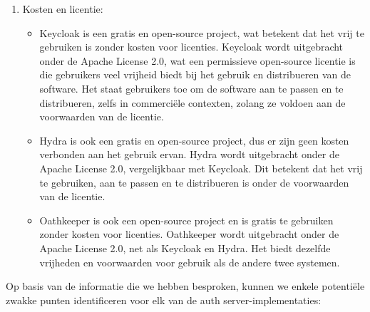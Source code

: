 \begin{enumerate}
  \item Kosten en licentie:
  \begin{itemize}
    \item Keycloak is een gratis en open-source project, wat betekent dat het vrij te gebruiken is zonder kosten voor licenties. Keycloak wordt uitgebracht onder de Apache License 2.0, wat een permissieve open-source licentie is die gebruikers veel vrijheid biedt bij het gebruik en distribueren van de software. Het staat gebruikers toe om de software aan te passen en te distribueren, zelfs in commerciële contexten, zolang ze voldoen aan de voorwaarden van de licentie.
    \item Hydra is ook een gratis en open-source project, dus er zijn geen kosten verbonden aan het gebruik ervan. Hydra wordt uitgebracht onder de Apache License 2.0, vergelijkbaar met Keycloak. Dit betekent dat het vrij te gebruiken, aan te passen en te distribueren is onder de voorwaarden van de licentie.
    \item Oathkeeper is ook een open-source project en is gratis te gebruiken zonder kosten voor licenties. Oathkeeper wordt uitgebracht onder de Apache License 2.0, net als Keycloak en Hydra. Het biedt dezelfde vrijheden en voorwaarden voor gebruik als de andere twee systemen.
  \end{itemize}
\end{enumerate}

Op basis van de informatie die we hebben besproken, kunnen we enkele potentiële zwakke punten identificeren voor elk van de \gls{auth} server-implementaties:

